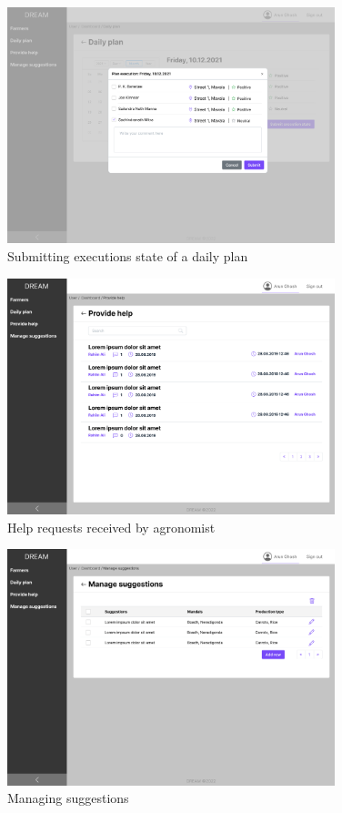 \begin{figure}[H]
\centering
\includegraphics[width=0.85\textwidth]{mockups/Agronomist_Dashboard_Visit plan_Submit.png}
\caption{Submitting executions state of a daily plan}
\end{figure}

\begin{figure}[H]
\centering
\includegraphics[width=0.85\textwidth]{mockups/Agronomist_Dashboard_Provide help.png}
\caption{Help requests received by agronomist}
\end{figure}

\begin{figure}[H]
\centering
\includegraphics[width=0.85\textwidth]{mockups/Agronomist_Dashboard_Manage suggestions.png}
\caption{Managing suggestions}
\end{figure}

